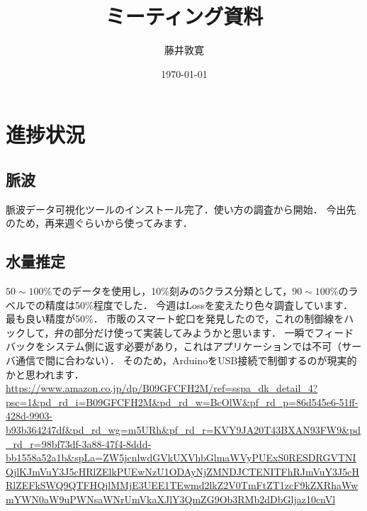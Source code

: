 \documentclass[a4j,10pt]{jarticle}
\title{ミーティング資料}
\author{藤井敦寛}
\date{\today}
\begin{document}
\maketitle

\section{進捗状況}

\subsection{脈波}
脈波データ可視化ツールのインストール完了．使い方の調査から開始．
今出先のため，再来週ぐらいから使ってみます．

\subsection{水量推定}
$50 \sim 100\%$でのデータを使用し，10\%刻みの5クラス分類として，$90 \sim 100\%$のラベルでの精度は50\%程度でした．
今週はLossを変えたり色々調査しています．最も良い精度が50\%．
市販のスマート蛇口を発見したので，これの制御線をハックして，弁の部分だけ使って実装してみようかと思います．
一瞬でフィードバックをシステム側に返す必要があり，これはアプリケーションでは不可（サーバ通信で間に合わない）．
そのため，ArduinoをUSB接続で制御するのが現実的かと思われます．\\
\url{https://www.amazon.co.jp/dp/B09GFCFH2M/ref=sspa_dk_detail_4?psc=1&pd_rd_i=B09GFCFH2M&pd_rd_w=BcOlW&pf_rd_p=86d545e6-51ff-428d-9903-b93b364247df&pd_rd_wg=m5URh&pf_rd_r=KVY9JA20T43BXAN93FW9&pd_rd_r=98bf73df-3a88-47f4-8ddd-bb1558a52a1b&spLa=ZW5jcnlwdGVkUXVhbGlmaWVyPUExS0RESDRGVTNIQjlKJmVuY3J5cHRlZElkPUEwNzU1ODAyNjZMNDJCTENITFhRJmVuY3J5cHRlZEFkSWQ9QTFHQjlMMjE3UEE1TEwmd2lkZ2V0TmFtZT1zcF9kZXRhaWwmYWN0aW9uPWNsaWNrUmVkaXJlY3QmZG9Ob3RMb2dDbGljaz10cnVl}





\end{document}
